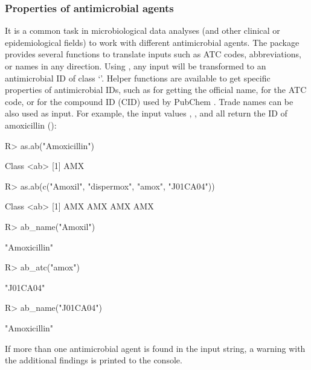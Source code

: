 \documentclass[article, shortnames]{jss}
\newcommand{\class}[1]{`\code{#1}'}
\newcommand{\fct}[1]{\code{#1()}}
\begin{document}
\subsubsection{Properties of antimicrobial agents}

It is a common task in microbiological data analyses (and other clinical or
epidemiological fields) to work with different antimicrobial agents.  The
 package provides several functions to translate inputs such as ATC
codes, abbreviations, or names in any direction.  Using \fct{as.ab}, any
input will be transformed to an antimicrobial ID of class \class{ab}. 
Helper functions are available to get specific properties of antimicrobial
IDs, such as \fct{ab\_name} for getting the official name, \fct{ab\_atc} for
the ATC code, or \fct{ab\_cid} for the compound ID (CID) used by PubChem
\citep{Kim2019-so}.  Trade names can be also used as input.  For example,
the input values , ,  and
 all return the ID of amoxicillin ():
%
\begin{CodeChunk}
\begin{CodeInput}
R> as.ab("Amoxicillin")
\end{CodeInput}
\begin{CodeOutput}
Class <ab>
[1] AMX
\end{CodeOutput}
\begin{CodeInput}
R> as.ab(c("Amoxil", "dispermox", "amox", "J01CA04"))
\end{CodeInput}
\begin{CodeOutput}
Class <ab>
[1] AMX AMX AMX AMX
\end{CodeOutput}
\begin{CodeInput}
R> ab_name("Amoxil")
\end{CodeInput}
\begin{CodeOutput}
[1] "Amoxicillin"
\end{CodeOutput}
\begin{CodeInput}
R> ab_atc("amox")
\end{CodeInput}
\begin{CodeOutput}
[1] "J01CA04"
\end{CodeOutput}
\begin{CodeInput}
R> ab_name("J01CA04")
\end{CodeInput}
\begin{CodeOutput}
[1] "Amoxicillin"
\end{CodeOutput}
\end{CodeChunk}
%
If more than one antimicrobial agent is found in the input string, a warning
with the additional findings is printed to the console.
\end{document}

